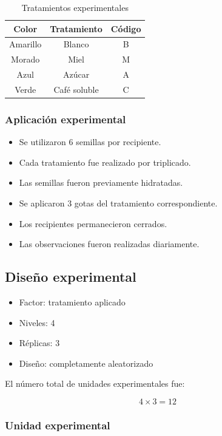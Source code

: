\begin{table}[H]
\centering
\begin{tabular}{ccc}
\toprule
Color & Tratamiento & Código \\
\midrule
Amarillo & Blanco & B \\
Morado & Miel & M \\
Azul & Azúcar & A \\
Verde & Café soluble & C \\
\bottomrule
\end{tabular}
\caption{Tratamientos experimentales}
\end{table}

\subsubsection{Aplicación experimental}

\begin{itemize}
    \item Se utilizaron 6 semillas por recipiente.
    \item Cada tratamiento fue realizado por triplicado.
    \item Las semillas fueron previamente hidratadas.
    \item Se aplicaron 3 gotas del tratamiento correspondiente.
    \item Los recipientes permanecieron cerrados.
    \item Las observaciones fueron realizadas diariamente.
\end{itemize}

\subsection{Diseño experimental}

\begin{itemize}
    \item Factor: tratamiento aplicado
    \item Niveles: 4
    \item Réplicas: 3
    \item Diseño: completamente aleatorizado
\end{itemize}

El número total de unidades experimentales fue:

\[
4\times3=12
\]

\subsubsection{Unidad experimental}

